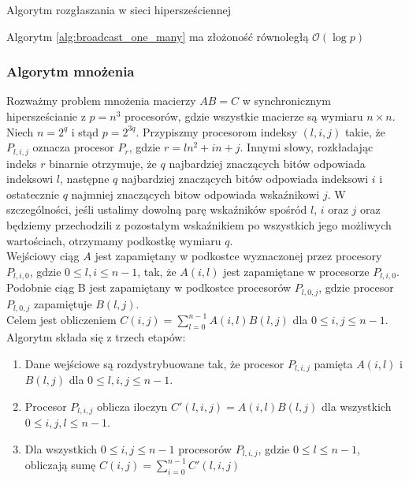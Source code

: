 \documentclass[a4paper,oneside,leqno,12pt]{book}
\theoremstyle{definition}
\theoremstyle{plain}
\theoremstyle{remark}
\begin{document}
\begin{algorithm}\label{alg:broadcast_one_many}
\caption{Algorytm rozgłaszania w sieci hipersześciennej}
\end{algorithm}


Algorytm \ref{alg:broadcast_one_many} ma złożoność równoległą \(\mathcal{O}(\log{p})\)

\subsubsection{Algorytm mnożenia}
Rozważmy problem mnożenia macierzy \(AB = C\) w synchronicznym hipersześcianie z \(p=n^3\) procesorów, gdzie wszystkie macierze są wymiaru \(n\times n\).\\
Niech \(n=2^q\) i stąd \(p=2^{3q}\). Przypiszmy procesorom indeksy \((l,i,j)\) takie, że \(P_{l,i,j}\) oznacza procesor \(P_r\), gdzie \(r=ln^{2}+in+j\). Innymi słowy, rozkładając indeks \(r\) binarnie otrzymuje, że \(q\) najbardziej znaczących bitów odpowiada indeksowi \(l\), następne \(q\) najbardziej znaczących bitów odpowiada indeksowi \(i\) i ostatecznie \(q\) najmniej znaczących bitow odpowiada wskaźnikowi \(j\). W szczególności, jeśli ustalimy dowolną parę wskaźników spośród \(l\), \(i\) oraz \(j\) oraz będziemy przechodzili z pozostałym wskaźnikiem po wszystkich jego możliwych wartościach, otrzymamy podkostkę wymiaru \(q\).\\

Wejściowy ciąg \(A\) jest zapamiętany w podkostce wyznaczonej przez procesory \(P_{l,i,0}\), gdzie \(0\leq l, i \leq n-1\), tak, że \(A(i,l)\) jest zapamiętane w procesorze \(P_{l,i,0}\).\\
Podobnie ciąg B jest zapamiętany w podkostce procesorów \(P_{l,0,j}\), gdzie procesor \(P_{l,0,j}\) zapamiętuje \(B(l,j)\).\\
Celem jest obliczeniem \(C(i,j)=\sum_{l=0}^{n-1}A(i,l)B(l,j)\) dla \(0\leq i, j\leq n-1\). Algorytm składa się z trzech etapów:
\begin{enumerate}
 \item Dane wejściowe są rozdystrybuowane tak, że procesor \(P_{l,i,j}\) pamięta \(A(i,l)\) i \(B(l,j)\) dla \(0\leq l, i, j \leq n-1\).
 \item Procesor \(P_{l,i,j}\) oblicza iloczyn \(C'(l,i,j)=A(i,l)B(l,j)\) dla wszystkich \(0\leq i, j, l \leq n-1\).
 \item Dla wszystkich \(0\leq i, j \leq n-1\) procesorów \(P_{l,i,j}\), gdzie \(0\leq l\leq n-1\), obliczają sumę \(C(i,j)=\sum_{i=0}^{n-1} C'(l,i,j)\)
\end{enumerate}
\end{document}
